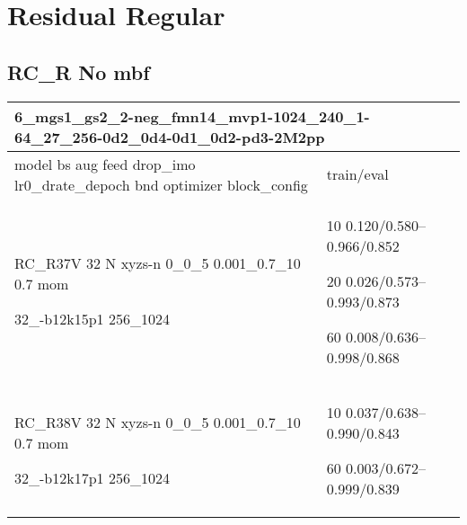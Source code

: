 \documentclass[,table,dvipsnames]{article}
\begin{document}
\section{Residual Regular}
\subsection{RC\_R No mbf}
\noindent\begin{tabular}{|p{10cm}|p{5cm}| }	
	\hline
	\multicolumn{2}{|p{15cm}|}{ 6\_mgs1\_gs2\_2-neg\_fmn14\_mvp1-1024\_240\_1-64\_27\_256-0d2\_0d4-0d1\_0d2-pd3-2M2pp}\\
	\hline
	model bs aug feed drop\_imo lr0\_drate\_depoch bnd optimizer block\_config & train/eval \\
	
	\rowcolor{red!20}
	RC\_R37V 32 N xyzs-n 0\_0\_5 0.001\_0.7\_10 0.7 mom \par 32\_-b12k15p1 256\_1024& 10 0.120/0.580--0.966/0.852 \par 20 0.026/0.573--0.993/0.873 \par 60 0.008/0.636--0.998/0.868\\
	
	\rowcolor{blue!20}
	RC\_R38V 32 N xyzs-n 0\_0\_5 0.001\_0.7\_10 0.7 mom \par 32\_-b12k17p1 256\_1024& 10 0.037/0.638--0.990/0.843\par 60 0.003/0.672--0.999/0.839\\
	\hline 
\end{tabular}
\end{document}
